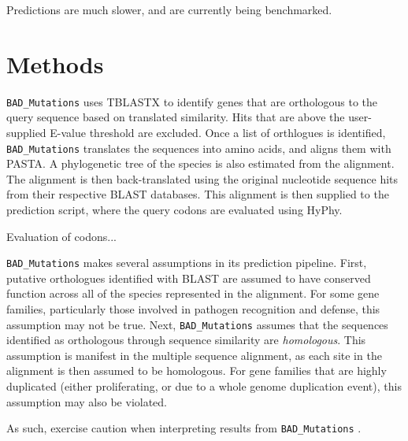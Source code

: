 \documentclass[12pt]{article}
\newcommand{\BM}{\texttt{BAD\_Mutations} }
\begin{document}
\par Predictions are much slower, and are currently being benchmarked.
\section*{Methods}
\par \BM uses TBLASTX to identify genes that are orthologous to the query
sequence based on translated similarity. Hits that are above the user-supplied
E-value threshold are excluded. Once a list of orthlogues is identified,
\BM translates the sequences into amino acids, and aligns them with PASTA. A
phylogenetic tree of the species is also estimated from the alignment. The
alignment is then back-translated using the original nucleotide sequence hits
from their respective BLAST databases. This alignment is then supplied to the
prediction script, where the query codons are evaluated using HyPhy.

\par Evaluation of codons...

\par \BM makes several assumptions in its prediction pipeline. First, putative
orthologues identified with BLAST are assumed to have conserved function across
all of the species represented in the alignment. For some gene families,
particularly those involved in pathogen recognition and defense, this assumption
may not be true. Next, \BM assumes that the sequences identified as orthologous
through sequence similarity are \textit{homologous}. This assumption is
manifest in the multiple sequence alignment, as each site in the alignment is
then assumed to be homologous. For gene families that are highly duplicated
(either proliferating, or due to a whole genome duplication event), this
assumption may also be violated.

\par As such, exercise caution when interpreting results from \BM.
\end{document}
